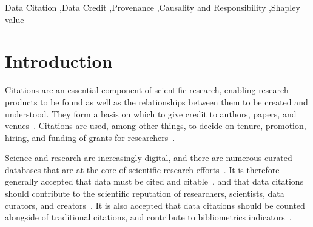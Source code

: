 \documentclass[preprint,12pt,sort&compress]{elsarticle}
\begin{document}
\begin{frontmatter}
\begin{keyword}
Data Citation \sep Data Credit \sep Provenance \sep Causality and Responsibility \sep Shapley value  %

\end{keyword}

\end{frontmatter}

\linenumbers

\section{Introduction}

Citations are an essential component of scientific research, enabling research products to be found as well as the relationships between them to be created and understood. 
They form a basis on which to give credit to authors, papers, and venues~\citep{ZouP16, cousijn2019bringing, cronin1984}.
Citations are used, among other things, to decide on tenure, promotion, hiring, and funding of grants for researchers~\citep{meho2007impact, Cronin01, Hartley17, Kosten16}.

Science and research are increasingly digital, and there are numerous curated databases that are at the core of scientific research efforts~\citep{bunemann2016citation}.
It is therefore generally accepted that data must be cited and citable~\citep{LawrenceEtAl2011,CallaghanDPTCKABBLLMHSWW12}, and that data citations should contribute to the scientific reputation of researchers, scientists, data curators, and creators~\citep{AltmanEtAl2015,Spengler2012}.
It is also accepted that data citations should be counted alongside of traditional citations, and contribute to bibliometrics indicators~\citep{Belter2014,Peters2016}.
\end{document}
